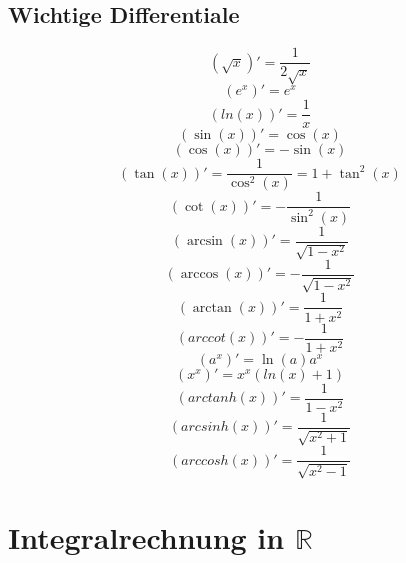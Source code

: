 \documentclass[a4paper,twocolumn,10pt]{article}
\begin{document}
\subsection{Wichtige Differentiale}
\begin{equation*}
(\sqrt{x})'=\frac{1}{2\sqrt{x}}
\end{equation*}
\begin{equation*}
(e^x)'=e^x
\end{equation*}
\begin{equation*}
(ln(x))'=\frac{1}{x}
\end{equation*}
\begin{equation*}
(\sin(x))'=\cos(x)
\end{equation*}
\begin{equation*}
(\cos(x))'=-\sin(x)
\end{equation*}
\begin{equation*}
(\tan(x))'=\frac{1}{\cos^2(x)}=1+\tan^2(x)
\end{equation*}
\begin{equation*}
(\cot(x))'=-\frac{1}{\sin^2(x)}
\end{equation*}
\begin{equation*}
(\arcsin(x))'=\frac{1}{\sqrt{1-x^2}}
\end{equation*}
\begin{equation*}
(\arccos(x))'=-\frac{1}{\sqrt{1-x^2}}
\end{equation*}
\begin{equation*}
(\arctan(x))'=\frac{1}{1+x^2}
\end{equation*}
\begin{equation*}
(arccot(x))'=-\frac{1}{1+x^2}
\end{equation*}
\begin{equation*}
(a^x)'=\ln(a)a^x
\end{equation*}
\begin{equation*}
(x^x)'=x^x(ln(x)+1)
\end{equation*}
\begin{equation*}
(arctanh(x))'=\frac{1}{1-x^2}
\end{equation*}
\begin{equation*}
(arcsinh(x))'=\frac{1}{\sqrt{x^2+1}}
\end{equation*}
\begin{equation*}
(arccosh(x))'=\frac{1}{\sqrt{x^2-1}}
\end{equation*}

\section{Integralrechnung in $\mathbb{R}$}
\end{document}
